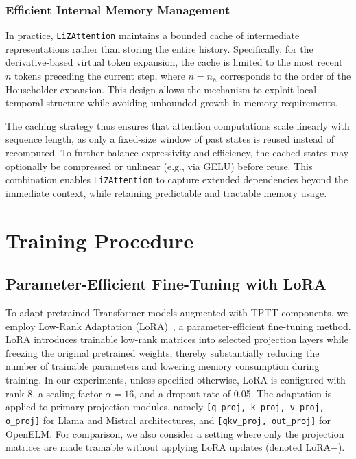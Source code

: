 \documentclass[10pt,a4paper]{article}
\begin{document}
\subsubsection{Efficient Internal Memory Management}

In practice, \texttt{LiZAttention} maintains a bounded cache of intermediate representations rather than storing the entire history. Specifically, for the derivative-based virtual token expansion, the cache is limited to the most recent $n$ tokens preceding the current step, where $n = n_h$ corresponds to the order of the Householder expansion. This design allows the mechanism to exploit local temporal structure while avoiding unbounded growth in memory requirements. 

The caching strategy thus ensures that attention computations scale linearly with sequence length, as only a fixed-size window of past states is reused instead of recomputed. To further balance expressivity and efficiency, the cached states may optionally be compressed or unlinear (e.g., via GELU) before reuse. This combination enables \texttt{LiZAttention} to capture extended dependencies beyond the immediate context, while retaining predictable and tractable memory usage.



\section{Training Procedure}\label{sec:training}

\subsection{Parameter-Efficient Fine-Tuning with LoRA}

To adapt pretrained Transformer models augmented with TPTT components, we employ Low-Rank Adaptation (LoRA)~\cite{hu2022lora, lora_hf}, a parameter-efficient fine-tuning method. LoRA introduces trainable low-rank matrices into selected projection layers while freezing the original pretrained weights, thereby substantially reducing the number of trainable parameters and lowering memory consumption during training. In our experiments, unless specified otherwise, LoRA is configured with rank 8, a scaling factor \(\alpha=16\), and a dropout rate of 0.05. The adaptation is applied to primary projection modules, namely \texttt{[q\_proj, k\_proj, v\_proj, o\_proj]} for Llama and Mistral architectures, and \texttt{[qkv\_proj, out\_proj]} for OpenELM. For comparison, we also consider a setting where only the projection matrices are made trainable without applying LoRA updates (denoted LoRA\(-\)).
\end{document}
